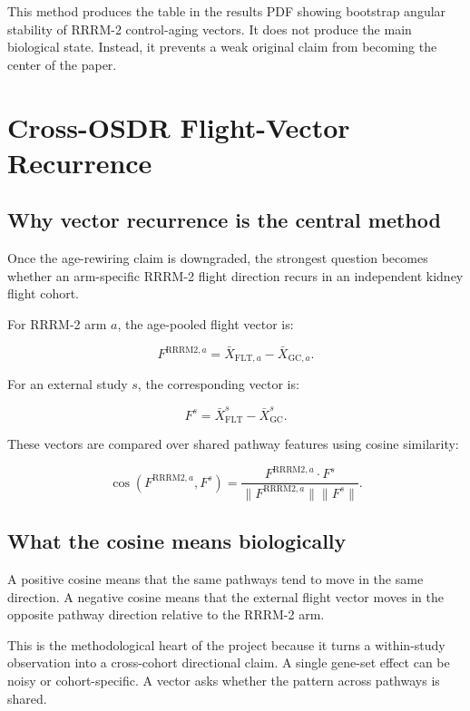 \documentclass[11pt]{article}
\begin{document}
This method produces the table in the results PDF showing bootstrap angular stability of RRRM-2 control-aging vectors. It does not produce the main biological state. Instead, it prevents a weak original claim from becoming the center of the paper.

\section{Cross-OSDR Flight-Vector Recurrence}

\subsection{Why vector recurrence is the central method}

Once the age-rewiring claim is downgraded, the strongest question becomes whether an arm-specific RRRM-2 flight direction recurs in an independent kidney flight cohort.

For RRRM-2 arm $a$, the age-pooled flight vector is:

\begin{equation}
F^{\mathrm{RRRM2},a}=\bar{X}_{\mathrm{FLT},a}-\bar{X}_{\mathrm{GC},a}.
\end{equation}

For an external study $s$, the corresponding vector is:

\begin{equation}
F^s=\bar{X}^{s}_{\mathrm{FLT}}-\bar{X}^{s}_{\mathrm{GC}}.
\end{equation}

These vectors are compared over shared pathway features using cosine similarity:

\begin{equation}
\cos(F^{\mathrm{RRRM2},a},F^s)=
\frac{F^{\mathrm{RRRM2},a}\cdot F^s}
{\lVert F^{\mathrm{RRRM2},a}\rVert \lVert F^s\rVert}.
\end{equation}

\subsection{What the cosine means biologically}

A positive cosine means that the same pathways tend to move in the same direction. A negative cosine means that the external flight vector moves in the opposite pathway direction relative to the RRRM-2 arm.

This is the methodological heart of the project because it turns a within-study observation into a cross-cohort directional claim. A single gene-set effect can be noisy or cohort-specific. A vector asks whether the pattern across pathways is shared.
\end{document}
